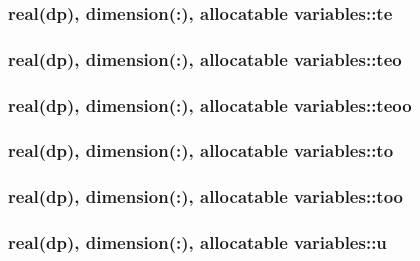 \hypertarget{classvariables_a6a12c6b89bcd378447b44ba71d496bb5}{
\subsubsection[{te}]{\setlength{\rightskip}{0pt plus 5cm}real(dp), dimension(\-:), allocatable variables\-::te}}\label{classvariables_a6a12c6b89bcd378447b44ba71d496bb5}
\hypertarget{classvariables_a6514ba664210b8f30c32f4c268a78564}{
\subsubsection[{teo}]{\setlength{\rightskip}{0pt plus 5cm}real(dp), dimension(\-:), allocatable variables\-::teo}}\label{classvariables_a6514ba664210b8f30c32f4c268a78564}
\hypertarget{classvariables_abab989916e0b0662f3b34317ef327935}{
\subsubsection[{teoo}]{\setlength{\rightskip}{0pt plus 5cm}real(dp), dimension(\-:), allocatable variables\-::teoo}}\label{classvariables_abab989916e0b0662f3b34317ef327935}
\hypertarget{classvariables_a77b6b14011022f80505967f9eac4eb4e}{
\subsubsection[{to}]{\setlength{\rightskip}{0pt plus 5cm}real(dp), dimension(\-:), allocatable variables\-::to}}\label{classvariables_a77b6b14011022f80505967f9eac4eb4e}
\hypertarget{classvariables_ab152916ec1bb4dc1ca22f1463e57a532}{
\subsubsection[{too}]{\setlength{\rightskip}{0pt plus 5cm}real(dp), dimension(\-:), allocatable variables\-::too}}\label{classvariables_ab152916ec1bb4dc1ca22f1463e57a532}
\hypertarget{classvariables_a8dc91b5653cabcfd17192c04c5c90d57}{
\subsubsection[{u}]{\setlength{\rightskip}{0pt plus 5cm}real(dp), dimension(\-:), allocatable variables\-::u}}\label{classvariables_a8dc91b5653cabcfd17192c04c5c90d57}
